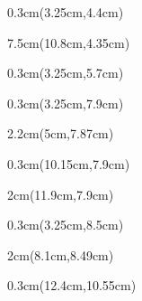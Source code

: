 \documentclass[a4paper]{article}
\begin{document}
\begin{Form}
 \BgThispage
\begin{textblock*}{0.3cm}(3.25cm,4.4cm) %
\noindent
\end{textblock*}

\begin{textblock*}{7.5cm}(10.8cm,4.35cm) %
\QualifikationErlaubnis
\end{textblock*}

\begin{textblock*}{0.3cm}(3.25cm,5.7cm) %
\noindent
\end{textblock*}

\begin{textblock*}{0.3cm}(3.25cm,7.9cm) %
\noindent
\end{textblock*}

\begin{textblock*}{2.2cm}(5cm,7.87cm) %
\noindent
\Vollzeit
\end{textblock*}

\begin{textblock*}{0.3cm}(10.15cm,7.9cm) %
\noindent
\end{textblock*}

\begin{textblock*}{2cm}(11.9cm,7.9cm) %
\noindent
\Teilzeit
\end{textblock*}

\begin{textblock*}{0.3cm}(3.25cm,8.5cm) %
\noindent
\end{textblock*}

\begin{textblock*}{2cm}(8.1cm,8.49cm) %
\noindent
\GeringfuegigeBeschaeftigung
\end{textblock*}

\begin{textblock*}{0.3cm}(12.4cm,10.55cm) %
\noindent
\end{textblock*}


\end{Form}
\end{document}
